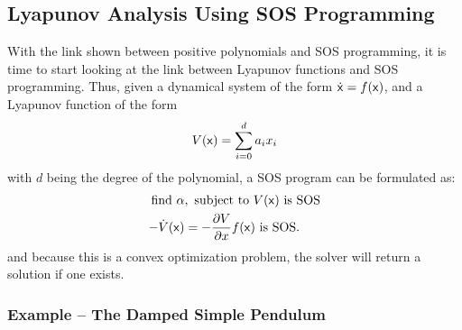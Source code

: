 \subsection{Lyapunov Analysis Using SOS Programming}

With the link shown between positive polynomials and \ac{SOS} programming, it is
time to start looking at the link between Lyapunov functions and SOS
programming. Thus, given a dynamical system of the form \(\dot{{\mathbf{\mathsf{x}}}} =
f({\mathbf{\mathsf{x}}})\), and a Lyapunov function of the form
\[
  V({\mathbf{\mathsf{x}}}) = \sum_{i=0}^{d} a_{i}x_{i}
\]
with \(d\) being the degree of the polynomial, a \ac{SOS} program can be
formulated as:
\begin{align*}
  \text{find \(\alpha\)}&, \text{ subject to } V({\mathbf{\mathsf{x}}}) \text{ is SOS}\\
  -\dot{V}({\mathbf{\mathsf{x}}}) &= -\frac{\partial V}{\partial x}f({\mathbf{\mathsf{x}}}) \text{ is SOS}.\\
\end{align*}
and because this is a convex optimization problem, the solver will return a
solution if one exists.

\subsubsection{Example -- The Damped Simple Pendulum}

